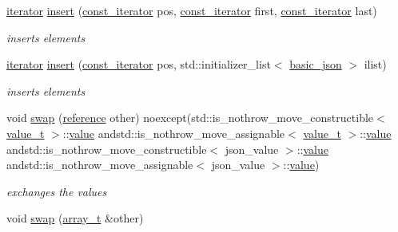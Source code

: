 \begin{DoxyCompactItemize}
\hyperlink{classnlohmann_1_1basic__json_1_1iterator}{iterator} \hyperlink{classnlohmann_1_1basic__json_aeaa0644fd6b99af364e772092268dfd6}{insert} (\hyperlink{classnlohmann_1_1basic__json_1_1const__iterator}{const\-\_\-iterator} pos, \hyperlink{classnlohmann_1_1basic__json_1_1const__iterator}{const\-\_\-iterator} first, \hyperlink{classnlohmann_1_1basic__json_1_1const__iterator}{const\-\_\-iterator} last)
\begin{DoxyCompactList}\small\item\em inserts elements \end{DoxyCompactList}\item 
\hyperlink{classnlohmann_1_1basic__json_1_1iterator}{iterator} \hyperlink{classnlohmann_1_1basic__json_aadb4e5be88221e5e28cdb752332f3d13}{insert} (\hyperlink{classnlohmann_1_1basic__json_1_1const__iterator}{const\-\_\-iterator} pos, std\-::initializer\-\_\-list$<$ \hyperlink{classnlohmann_1_1basic__json}{basic\-\_\-json} $>$ ilist)
\begin{DoxyCompactList}\small\item\em inserts elements \end{DoxyCompactList}\item 
void \hyperlink{classnlohmann_1_1basic__json_aafda4fe80657173ac8efa8f862144840}{swap} (\hyperlink{classnlohmann_1_1basic__json_a3ec8e17be8732fe436e9d6733f52b7a3}{reference} other) noexcept(std\-::is\-\_\-nothrow\-\_\-move\-\_\-constructible$<$ \hyperlink{classnlohmann_1_1basic__json_a231b02148577b69a154b2ce2c87a5522}{value\-\_\-t} $>$\-::\hyperlink{classnlohmann_1_1basic__json_a0a2cbbd95862a623e7dc5c37e67dead0}{value} andstd\-::is\-\_\-nothrow\-\_\-move\-\_\-assignable$<$ \hyperlink{classnlohmann_1_1basic__json_a231b02148577b69a154b2ce2c87a5522}{value\-\_\-t} $>$\-::\hyperlink{classnlohmann_1_1basic__json_a0a2cbbd95862a623e7dc5c37e67dead0}{value} andstd\-::is\-\_\-nothrow\-\_\-move\-\_\-constructible$<$ json\-\_\-value $>$\-::\hyperlink{classnlohmann_1_1basic__json_a0a2cbbd95862a623e7dc5c37e67dead0}{value} andstd\-::is\-\_\-nothrow\-\_\-move\-\_\-assignable$<$ json\-\_\-value $>$\-::\hyperlink{classnlohmann_1_1basic__json_a0a2cbbd95862a623e7dc5c37e67dead0}{value})
\begin{DoxyCompactList}\small\item\em exchanges the values \end{DoxyCompactList}\item 
void \hyperlink{classnlohmann_1_1basic__json_a8209621de6184d9eabe136b7c8f61935}{swap} (\hyperlink{classnlohmann_1_1basic__json_ab00b882d39306d663c23dab110f5cae0}{array\-\_\-t} \&other)

\end{DoxyCompactItemize}
